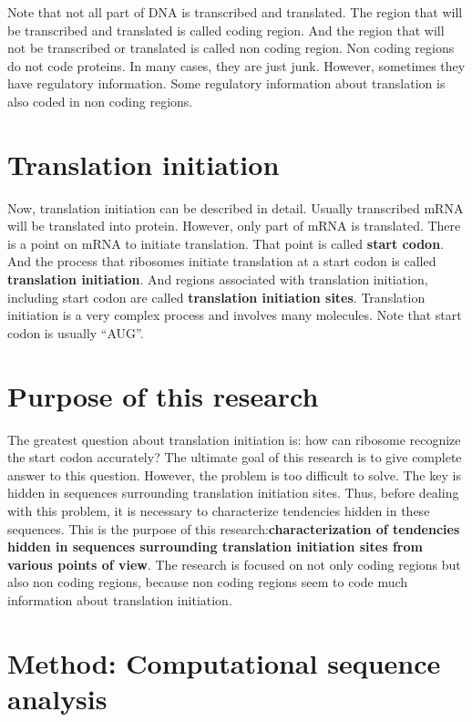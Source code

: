 Note that not all part of DNA is transcribed and translated.  The
region that will be transcribed and translated is called coding
region. And the region that will not be transcribed or translated is
called non coding region. Non coding regions do not code
proteins. In many cases, they are just junk. However, sometimes they have
regulatory information. Some regulatory information about translation
is also coded in non coding regions.


\section{Translation initiation}

Now, translation initiation can be described in detail. Usually
transcribed mRNA will be translated into protein. However, only part of
mRNA is translated. There is a point on mRNA to initiate
translation. That point is called {\bf start codon}. And the process
that ribosomes initiate translation at a start codon is called {\bf
translation initiation}. And regions associated with translation
initiation, including start codon are called {\bf translation initiation
sites}. Translation initiation is a very complex process and involves
many molecules. Note that start codon is usually ``AUG''.


\section{Purpose of this research}

The greatest question about translation initiation is: how can ribosome
recognize the start codon accurately? The ultimate goal of this research
is to give complete answer to this question. However, the problem is too
difficult to solve. The key is hidden in sequences surrounding
translation initiation sites. Thus, before dealing with this problem, it
is necessary to characterize tendencies hidden in these sequences. This
is the purpose of this research:{\bf characterization of tendencies
hidden in sequences surrounding translation initiation sites from
various points of view}. The research is focused on not only coding
regions but also non coding regions, because non coding regions seem to
code much information about translation initiation.

\section{Method: Computational sequence analysis}
\label{method_compseq}

